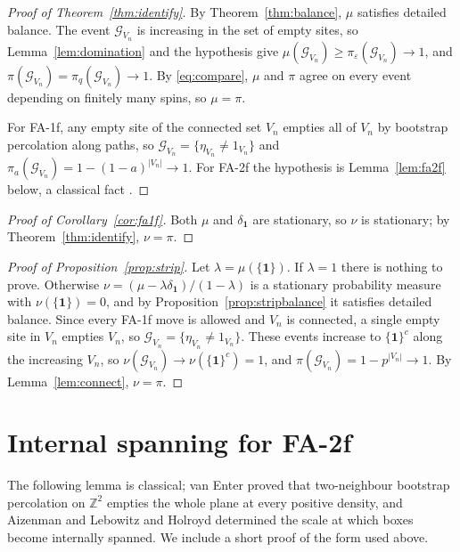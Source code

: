 \documentclass[11pt]{amsart}
\theoremstyle{remark}
\newcommand{\Z}{\mathbb{Z}}
\begin{document}
\begin{proof}[Proof of Theorem~\ref{thm:identify}]
By Theorem~\ref{thm:balance}, $\mu$ satisfies detailed balance. The event $\mathcal G_{V_n}$ is increasing in the set of
empty sites, so Lemma~\ref{lem:domination} and the hypothesis give $\mu(\mathcal G_{V_n})\ge\pi_\varepsilon(\mathcal
G_{V_n})\to1$, and $\pi(\mathcal G_{V_n})=\pi_q(\mathcal G_{V_n})\to1$. By \eqref{eq:compare}, $\mu$ and $\pi$ agree on
every event depending on finitely many spins, so $\mu=\pi$.

For FA-1f, any empty site of the connected set $V_n$ empties all of $V_n$ by bootstrap percolation along paths, so
$\mathcal G_{V_n}=\{\eta_{V_n}\ne1_{V_n}\}$ and $\pi_a(\mathcal G_{V_n})=1-(1-a)^{|V_n|}\to1$. For FA-2f the hypothesis
is Lemma~\ref{lem:fa2f} below, a classical fact \cite{vE87,AL88}.
\end{proof}

\begin{proof}[Proof of Corollary~\ref{cor:fa1f}]
Both $\mu$ and $\delta_{\mathbf 1}$ are stationary, so $\nu$ is stationary; by Theorem~\ref{thm:identify}, $\nu=\pi$.
\end{proof}

\begin{proof}[Proof of Proposition~\ref{prop:strip}]
Let $\lambda=\mu(\{\mathbf 1\})$. If $\lambda=1$ there is nothing to prove. Otherwise
$\nu=(\mu-\lambda\delta_{\mathbf 1})/(1-\lambda)$ is a stationary probability measure with $\nu(\{\mathbf 1\})=0$, and
by Proposition~\ref{prop:stripbalance} it satisfies detailed balance. Since every FA-1f move is allowed and $V_n$ is
connected, a single empty site in $V_n$ empties $V_n$, so $\mathcal G_{V_n}=\{\eta_{V_n}\ne1_{V_n}\}$. These events
increase to $\{\mathbf 1\}^c$ along the increasing $V_n$, so $\nu(\mathcal G_{V_n})\to\nu(\{\mathbf 1\}^c)=1$, and
$\pi(\mathcal G_{V_n})=1-p^{|V_n|}\to1$. By Lemma~\ref{lem:connect}, $\nu=\pi$.
\end{proof}

\section{Internal spanning for FA-2f}\label{sec:fa2f}

The following lemma is classical; van Enter \cite{vE87} proved that two-neighbour bootstrap percolation on $\Z^2$
empties the whole plane at every positive density, and Aizenman and Lebowitz \cite{AL88} and Holroyd \cite{Hol03}
determined the scale at which boxes become internally spanned. We include a short proof of the form used above.
\end{document}
